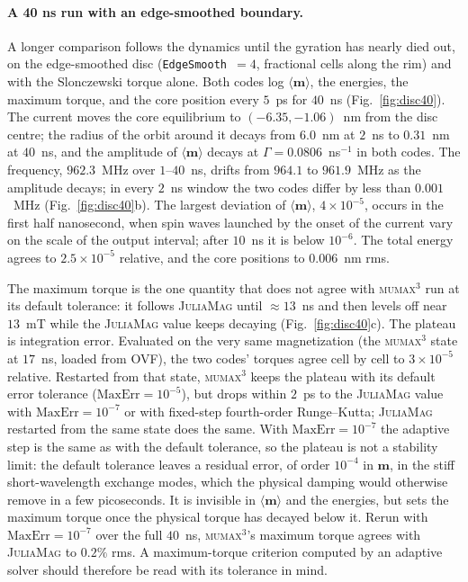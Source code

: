 \documentclass{article}      %
\newcommand{\JuliaMag}{\textsc{JuliaMag}}
\newcommand{\mumax}{\textsc{mumax}$^3$}
\newcommand{\vm}{\bm{m}}
\begin{document}
\paragraph{A 40 ns run with an edge-smoothed boundary.}
A longer comparison follows the dynamics until the gyration has nearly died
out, on the edge-smoothed disc (\texttt{EdgeSmooth}~$=4$, fractional cells
along the rim) and with the Slonczewski torque alone. Both codes log
$\langle\vm\rangle$, the energies, the maximum torque, and the core position
every $5$~ps for $40$~ns (Fig.~\ref{fig:disc40}). The current moves the core
equilibrium to $(-6.35,-1.06)$~nm from the disc centre; the radius of the
orbit around it decays from $6.0$~nm at $2$~ns to $0.31$~nm at $40$~ns, and the
amplitude of $\langle\vm\rangle$ decays at $\Gamma = 0.0806$~ns$^{-1}$ in both
codes. The frequency, $962.3$~MHz over $1$--$40$~ns, drifts from $964.1$ to
$961.9$~MHz as the amplitude decays; in every $2$~ns window the two codes
differ by less than $0.001$~MHz (Fig.~\ref{fig:disc40}b). The largest deviation
of $\langle\vm\rangle$, $4\times10^{-5}$, occurs in the first half
nanosecond, when spin waves launched by the onset of the current vary on the
scale of the output interval; after $10$~ns it is below $10^{-6}$. The total
energy agrees to $2.5\times10^{-5}$ relative, and the core positions to
$0.006$~nm rms.

The maximum torque is the one quantity that does not agree with \mumax{} run
at its default tolerance: it follows \JuliaMag{} until ${\approx}13$~ns and
then levels off near $13$~mT while the \JuliaMag{} value keeps decaying
(Fig.~\ref{fig:disc40}c). The plateau is integration error. Evaluated on the
very same magnetization (the \mumax{} state at $17$~ns, loaded from OVF), the
two codes' torques agree cell by cell to $3\times10^{-5}$ relative. Restarted
from that state, \mumax{} keeps the plateau with its default error tolerance
($\mathrm{MaxErr}=10^{-5}$), but drops within $2$~ps to the \JuliaMag{} value
with $\mathrm{MaxErr}=10^{-7}$ or with fixed-step fourth-order Runge--Kutta;
\JuliaMag{} restarted from the same state does the same. With
$\mathrm{MaxErr}=10^{-7}$ the adaptive step is the same as with the default
tolerance, so the plateau is not a stability limit: the default tolerance
leaves a residual error, of order $10^{-4}$ in $\vm$, in the stiff short-wavelength
exchange modes, which the physical damping would otherwise remove in a few
picoseconds. It is invisible in $\langle\vm\rangle$ and the energies, but sets
the maximum torque once the physical torque has decayed below it. Rerun with
$\mathrm{MaxErr}=10^{-7}$ over the full $40$~ns, \mumax's maximum torque agrees
with \JuliaMag{} to $0.2\%$ rms. A maximum-torque criterion computed by an
adaptive solver should therefore be read with its tolerance in mind.
\end{document}
